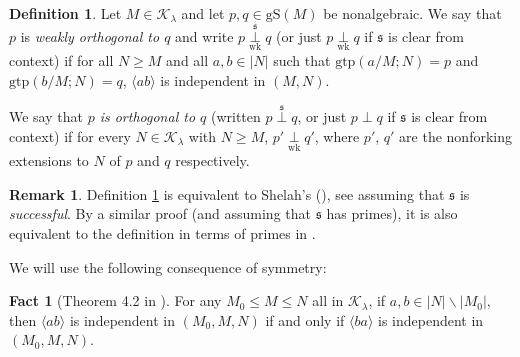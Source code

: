 \documentclass[12pt]{amsart}
\theoremstyle{definition}
\newtheorem{defin}[mydef]{Definition}
\newtheorem{remark}[mydef]{Remark}
\newtheorem{fact}[mydef]{Fact}
\begin{document}
\begin{defin}\label{perp-def}
  Let $M \in {\mathcal{K}}_\lambda$ and let $p, q \in {\text{gS}} (M)$ be nonalgebraic. We say that $p$ is \emph{weakly orthogonal to $q$} and write $p {{{\underset{{{\text{wk}}}}{\overset{{{{\mathfrak{s}}}}}{{\perp}}}}}} q$ (or just $p {{{{\underset{{{\text{wk}}}}{\overset{{{{}}}}{{\perp}}}}}}} q$ if ${\mathfrak{s}}$ is clear from context) if for all $N {\ge} M$ and all $a, b \in |N|$ such that ${\text{gtp}} (a / M; N) = p$ and ${\text{gtp}} (b / M; N) = q$, ${\langle {a b} \rangle}$ is independent in $(M, N)$.

  We say that \emph{$p$ is orthogonal to $q$} (written $p {{\underset{{{}}}{\overset{{{\mathfrak{s}}}}{{\perp}}}}} q$, or just $p \perp q$ if ${\mathfrak{s}}$ is clear from context) if for every $N \in {\mathcal{K}}_\lambda$ with $N {\ge} M$, $p' {{{{\underset{{{\text{wk}}}}{\overset{{{{}}}}{{\perp}}}}}}} q'$, where $p'$, $q'$ are the nonforking extensions to $N$ of $p$ and $q$ respectively.
\end{defin}
\begin{remark}
  Definition \ref{perp-def} is equivalent to Shelah's (\cite[Definition III.6.2]{shelahaecbook}), see \cite[Claim III.6.4.(2)]{shelahaecbook} assuming that ${\mathfrak{s}}$ is \emph{successful}. By a similar proof (and assuming that ${\mathfrak{s}}$ has primes), it is also equivalent to the definition in terms of primes in \cite[Definition 2.2]{categ-primes-v3}.
\end{remark}

We will use the following consequence of symmetry:

\begin{fact}[Theorem 4.2 in \cite{jasi}]\label{sym-indep}
  For any $M_0 {\le} M {\le} N$ all in ${\mathcal{K}}_\lambda$, if $a, b \in |N| \backslash |M_0|$, then ${\langle {ab} \rangle}$ is independent in $(M_0, M, N)$ if and only if ${\langle {ba} \rangle}$ is independent in $(M_0, M, N)$.
\end{fact}
\end{document}
